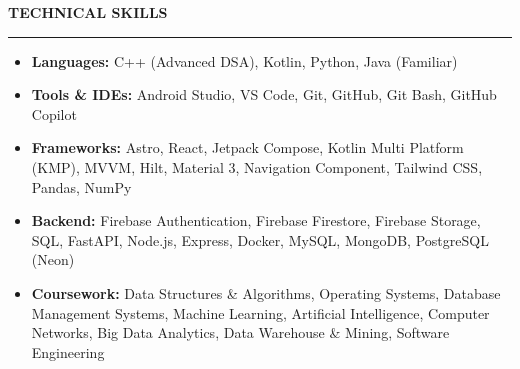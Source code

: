 \documentclass[10pt]{article}
\newcommand{\resheading}[1]{\vspace{6pt} \noindent \textbf{\large\scshape{#1}} \vspace{3pt} \hrule \vspace{4pt}}
\begin{document}
\resheading{TECHNICAL SKILLS}
\begin{itemize}
\item \textbf{Languages:} C++ (Advanced DSA), Kotlin, Python, Java (Familiar)
\item \textbf{Tools \& IDEs:} Android Studio, VS Code, Git, GitHub, Git Bash, GitHub Copilot
\item \textbf{Frameworks:} Astro, React, Jetpack Compose, Kotlin Multi Platform (KMP), MVVM, Hilt, Material 3, Navigation Component, Tailwind CSS, Pandas, NumPy
\item \textbf{Backend:} Firebase Authentication, Firebase Firestore, Firebase Storage, SQL, FastAPI, Node.js, Express, Docker, MySQL, MongoDB, PostgreSQL (Neon)
\item \textbf{Coursework:} Data Structures \& Algorithms, Operating Systems, Database Management Systems, Machine Learning, Artificial Intelligence, Computer Networks, Big Data Analytics, Data Warehouse \& Mining, Software Engineering
\end{itemize}
\end{document}
